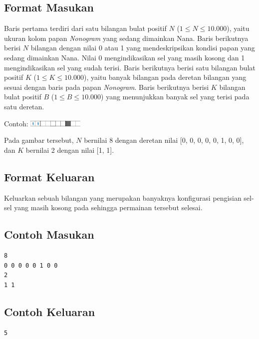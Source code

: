 \documentclass{article}
\begin{document}
\subsection*{Format Masukan}

Baris pertama terdiri dari satu bilangan bulat positif $N$ ($1 \leq N \leq 10.000$), yaitu ukuran kolom papan \textit{Nonogram} yang sedang dimainkan Nana.
Baris berikutnya berisi $N$ bilangan dengan nilai 0 atau 1 yang mendeskripsikan kondisi papan  yang sedang dimainkan Nana. 
Nilai 0 mengindikasikan sel yang masih kosong dan 1 mengindikasikan sel yang sudah terisi.
Baris berikutnya berisi satu bilangan bulat positif $K$ ($1 \leq K \leq 10.000$), yaitu banyak bilangan pada deretan bilangan yang sesuai dengan baris pada papan \textit{Nonogram}.
Baris berikutnya berisi $K$ bilangan bulat positif $B$ ($1 \leq B \leq 10.000$) yang menunjukkan banyak sel yang terisi pada satu deretan.

Contoh:
\includegraphics[width=100px]{Homogram-Row}

Pada gambar tersebut, $N$ bernilai 8 dengan deretan nilai [0, 0, 0, 0, 0, 1, 0, 0], dan $K$ bernilai 2 dengan nilai [1, 1].

\subsection*{Format Keluaran}

Keluarkan sebuah bilangan yang merupakan banyaknya konfigurasi pengisian sel-sel yang masih kosong pada  
sehingga permainan tersebut selesai.
\\

\begin{multicols}{2}
\subsection*{Contoh Masukan}
\begin{lstlisting}
8
0 0 0 0 0 1 0 0
2
1 1
\end{lstlisting}
\columnbreak
\subsection*{Contoh Keluaran}
\begin{lstlisting}
5
\end{lstlisting}
\vfill
\null
\end{multicols}

\pagebreak
\end{document}
